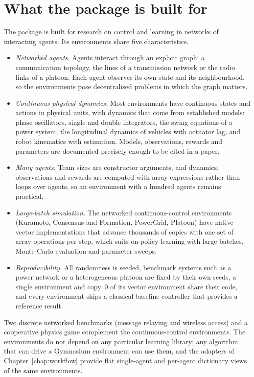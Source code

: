 \section{What the package is built for}\label{sec:intro-audience}

The package is built for research on control and learning in networks of
interacting agents. Its environments share five characteristics.

\begin{itemize}
  \item \emph{Networked agents.} Agents interact through an explicit graph:
    a communication topology, the lines of a transmission network or the
    radio links of a platoon. Each agent observes its own state and its
    neighbourhood, so the environments pose decentralised problems in which
    the graph matters.
  \item \emph{Continuous physical dynamics.} Most environments have
    continuous states and actions in physical units, with dynamics that come
    from established models: phase oscillators, single and double
    integrators, the swing equations of a power system, the longitudinal
    dynamics of vehicles with actuator lag, and robot kinematics with
    estimation. Models, observations, rewards and parameters are documented
    precisely enough to be cited in a paper.
  \item \emph{Many agents.} Team sizes are constructor arguments, and
    dynamics, observations and rewards are computed with array expressions
    rather than loops over agents, so an environment with a hundred agents
    remains practical.
  \item \emph{Large-batch simulation.} The networked continuous-control
    environments (Kuramoto, Consensus and Formation, PowerGrid, Platoon) have
    native vector implementations that advance thousands of copies with one
    set of array operations per step, which suits on-policy learning with
    large batches, Monte-Carlo evaluation and parameter sweeps.
  \item \emph{Reproducibility.} All randomness is seeded, benchmark systems
    such as a power network or a heterogeneous platoon are fixed by their own
    seeds, a single environment and copy~0 of its vector environment share
    their code, and every environment ships a classical baseline controller
    that provides a reference result.
\end{itemize}

Two discrete networked benchmarks (message relaying and wireless access) and a
cooperative physics game complement the continuous-control environments. The
environments do not depend on any particular learning library; any algorithm
that can drive a Gymnasium environment can use them, and the adapters of
Chapter~\ref{chap:workflow} provide flat single-agent and per-agent dictionary
views of the same environments.

